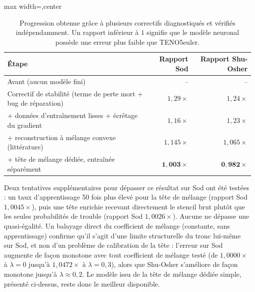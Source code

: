 \documentclass[11pt]{article}
\newcommand{\rowrule}{\specialrule{0.30pt}{0pt}{0pt}}
\begin{document}
\begin{table}[htbp]

\begin{adjustbox}{max width=\textwidth,center}

\begin{tabular}{lrr}

\toprule

\textbf{Étape}
&
\textbf{Rapport Sod}
&
\textbf{Rapport Shu-Osher}
\\

\midrule

Avant (aucun modèle fini)
&
--
&
--
\\

\rowrule

Correctif de stabilité
(terme de perte mort + bug de réparation)
&
$1{,}29\times$
&
$1{,}24\times$
\\

\rowrule

+ données d'entraînement lisses
+ écrêtage du gradient
&
$1{,}16\times$
&
$1{,}23\times$
\\

\rowrule

+ reconstruction à mélange convexe
(littérature)
&
$1{,}145\times$
&
$1{,}065\times$
\\

\rowrule

+ tête de mélange dédiée,
entraînée séparément
&
$\mathbf{1{,}003\times}$
&
$\mathbf{0{,}982\times}$
\\

\bottomrule

\end{tabular}

\end{adjustbox}

\caption{
Progression obtenue grâce à plusieurs correctifs diagnostiqués
et vérifiés indépendamment.
Un rapport inférieur à $1$ signifie que le modèle neuronal possède
une erreur plus faible que TENO5euler.
}

\end{table}

Deux tentatives supplémentaires pour dépasser ce résultat sur Sod ont été
testées : un taux d'apprentissage 50 fois plus élevé pour la tête de mélange
(rapport Sod $1{,}0045\times$), puis une tête enrichie recevant directement
le stencil brut plutôt que les seules probabilités de trouble (rapport Sod
$1{,}0026\times$). Aucune ne dépasse une quasi-égalité. Un balayage direct
du coefficient de mélange (constante, sans apprentissage) confirme qu'il
s'agit d'une limite structurelle du tronc lui-même sur Sod, et non d'un
problème de calibration de la tête : l'erreur sur Sod augmente de façon
monotone avec tout coefficient de mélange testé (de $1{,}0000\times$ à
$\lambda{=}0$ jusqu'à $1{,}0472\times$ à $\lambda{=}0{,}3$), alors que
Shu-Osher s'améliore de façon monotone jusqu'à $\lambda \approx 0{,}2$.
Le modèle issu de la tête de mélange dédiée simple, présenté ci-dessus,
reste donc le meilleur disponible.
\end{document}
